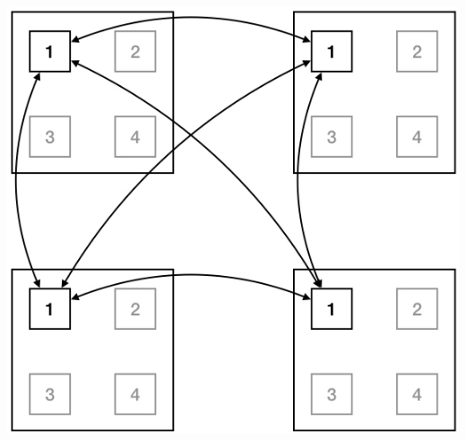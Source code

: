 \documentclass{beamer}
\begin{document}
\begin{frame}
\begin{columns}
\begin{column}{0.35\textwidth}
\begin{center}
	\includegraphics[width=1.0\textwidth]{remote}
\end{center}
\end{column}

\end{columns}

\end{frame}

\end{document}
